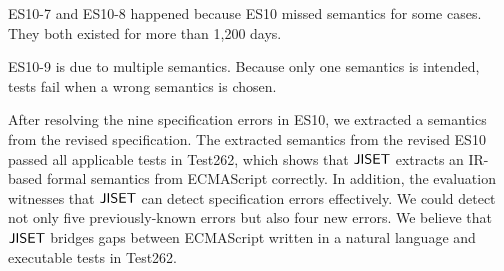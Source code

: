 ES10-7 and ES10-8 happened because ES10 missed semantics for some
cases.  They both existed for more than 1,200 days.

ES10-9 is due to multiple semantics.  Because only one semantics is
intended,  tests fail when a wrong semantics is chosen.

After resolving the nine specification errors in ES10, we extracted a
semantics from the revised specification.  The extracted semantics
from the revised ES10 passed all  applicable tests in Test262,
which shows that \( \text{\sf JISET} \) extracts an IR-based formal semantics
from ECMAScript correctly.  In addition, the evaluation witnesses that
\( \text{\sf JISET} \) can detect specification errors effectively.
We could detect not only five previously-known errors
but also four new errors.  We believe that \( \text{\sf JISET} \) bridges gaps
between ECMAScript written in a natural language and executable tests
in Test262.

